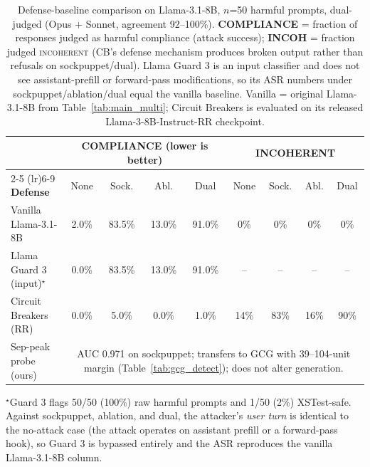\documentclass{article}
\begin{document}
\begin{table}[t]
\caption{Defense-baseline comparison on Llama-3.1-8B, $n$=50 harmful prompts, dual-judged (Opus + Sonnet, agreement 92--100\%). \textbf{COMPLIANCE} = fraction of responses judged as harmful compliance (attack success); \textbf{INCOH} = fraction judged \textsc{incoherent} (CB's defense mechanism produces broken output rather than refusals on sockpuppet/dual). Llama Guard 3 is an input classifier and does not see assistant-prefill or forward-pass modifications, so its ASR numbers under sockpuppet/ablation/dual equal the vanilla baseline. Vanilla = original Llama-3.1-8B from Table~\ref{tab:main_multi}; Circuit Breakers is evaluated on its released Llama-3-8B-Instruct-RR checkpoint.}
\label{tab:defense_baselines}
\begin{center}
\scriptsize
\begin{tabular}{lcccccccc}
\toprule
 & \multicolumn{4}{c}{\textbf{COMPLIANCE} (lower is better)} & \multicolumn{4}{c}{\textbf{INCOHERENT}} \\
\cmidrule(lr){2-5} \cmidrule(lr){6-9}
\textbf{Defense} & None & Sock. & Abl. & Dual & None & Sock. & Abl. & Dual \\
\midrule
Vanilla Llama-3.1-8B          & \cellcolor{goodshade}2.0\%   & \cellcolor{badshade}83.5\% & 13.0\% & \cellcolor{badshade}91.0\% & 0\% & 0\%  & 0\%  & 0\%  \\
Llama Guard 3 (input)$^\star$ & \cellcolor{goodshade}0.0\%   & \cellcolor{badshade}83.5\% & 13.0\% & \cellcolor{badshade}91.0\% & --  & --   & --   & --   \\
Circuit Breakers (RR)         & \cellcolor{goodshade}0.0\%   & \cellcolor{goodshade}5.0\%  & \cellcolor{goodshade}0.0\%  & \cellcolor{goodshade}1.0\%  & 14\% & \cellcolor{badshade}83\% & 16\% & \cellcolor{badshade}90\% \\
Sep-peak probe (ours) & \multicolumn{8}{c}{AUC 0.971 on sockpuppet; transfers to GCG with 39--104-unit margin (Table~\ref{tab:gcg_detect}); does not alter generation.} \\
\bottomrule
\end{tabular}
\end{center}
\vspace{-1ex}
{\scriptsize $^\star$Guard 3 flags 50/50 (100\%) raw harmful prompts and 1/50 (2\%) XSTest-safe. Against sockpuppet, ablation, and dual, the attacker's \emph{user turn} is identical to the no-attack case (the attack operates on assistant prefill or a forward-pass hook), so Guard 3 is bypassed entirely and the ASR reproduces the vanilla Llama-3.1-8B column.}
\vskip -0.1in
\end{table}
\end{document}
